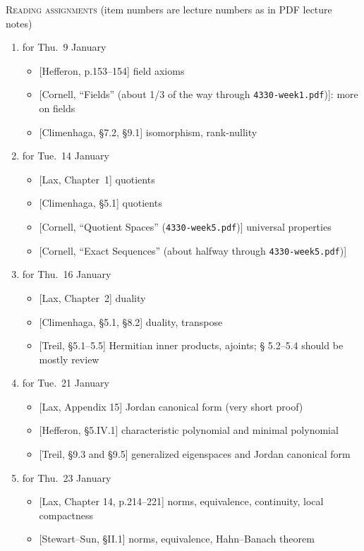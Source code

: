 \documentclass[11pt]{article}
\newcommand\total[2]{\marginpar{\colorbox{yellow}{\huge #1/#2}}}
\newcommand\0{\mathbf{0}}
\newcommand\<{\langle}
\renewcommand\>{\rangle}
\begin{document}
\noindent
\textsc{Reading assignments}\total{}{57}%
\hfill
(item numbers are lecture numbers as in PDF lecture notes)
\begin{enumerate}[itemsep=-1ex]
\item%
for Thu.~9 January
  \begin{itemize}
  \item{}%
  [Hefferon, p.153--154] field axioms
  \item{}%
  [Cornell, ``Fields'' (about 1/3 of the way through
  \texttt{4330-week1.pdf})]: more on fields%
  \item{}%
  [Climenhaga, \S 7.2, \S 9.1] isomorphism, rank-nullity
  \end{itemize}

\item%
for Tue.~14 January
  \begin{itemize}
  \item{}%
  [Lax, Chapter~1] quotients
  \item{}%
  [Climenhaga, \S 5.1] quotients
  \item{}%
  [Cornell, ``Quotient Spaces'' (\texttt{4330-week5.pdf})] universal properties
  \item{}%
  [Cornell, ``Exact Sequences'' (about halfway through \texttt{4330-week5.pdf})]
  \end{itemize}

\item%
for Thu.~16 January
  \begin{itemize}
  \item{}%
  [Lax, Chapter~2] duality
  \item{}%
  [Climenhaga, \S 5.1, \S 8.2] duality, transpose
  \item{}%
  [Treil, \S 5.1--5.5] Hermitian inner products, ajoints; \S
  5.2--5.4 should be mostly review
  \end{itemize}

\item%
for Tue.~21 January
  \begin{itemize}
  \item{}%
  [Lax, Appendix 15] Jordan canonical form (very short proof)
  \item{}%
  [Hefferon, \S 5.IV.1] characteristic polynomial and minimal polynomial
  \item{}%
  [Treil, \S 9.3 and \S 9.5] generalized eigenspaces and Jordan canonical form
  \end{itemize}

\item%
for Thu.~23 January
  \begin{itemize}
  \item{}%
  [Lax, Chapter 14, p.214--221] norms, equivalence, continuity, local compactness
  \item{}%
  [Stewart--Sun, \S II.1] norms, equivalence, Hahn--Banach theorem
  \end{itemize}


\end{enumerate}
\end{document}
